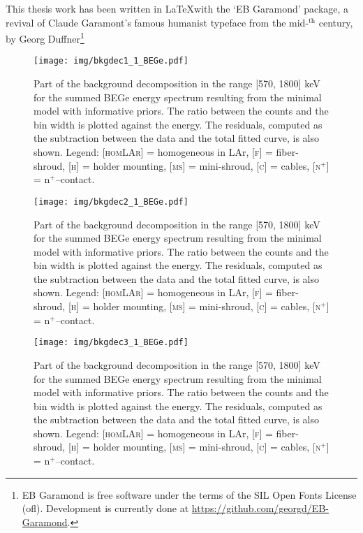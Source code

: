 This thesis work has been written in \LaTeX with the `EB Garamond' package, a revival of Claude Garamont's famous humanist typeface from the mid-$^\text{th}$ century, by Georg Duffner\footnote{EB Garamond is free software under the terms of the SIL Open Fonts License (ofl). Development is currently done at \url{https://github.com/georgd/EB-Garamond}.}
\begin{landscape}
	\begin{figure}
		\centering
		\texttt{[image: img/bkgdec1\_1\_BEGe.pdf]}
		\caption{Part of the background decomposition in the range [570, 1800] keV for the summed BEGe energy spectrum resulting from the minimal model with informative priors. The ratio between the counts and the bin width is plotted against the energy. The residuals, computed as the subtraction between the data and the total fitted curve, is also shown. Legend: \textsc{[homLAr]} = homogeneous in LAr, \textsc{[f]} = fiber-shroud, \textsc{[h]} = holder mounting, \textsc{[ms]} = mini-shroud, \textsc{[c]} = cables, \textsc{[n$^+$]} = n$^+$--contact.}\label{fig:bkgdec1}
	\end{figure}
	\begin{figure}
		\centering
		\texttt{[image: img/bkgdec2\_1\_BEGe.pdf]}
		\caption{Part of the background decomposition in the range [570, 1800] keV for the summed BEGe energy spectrum resulting from the minimal model with informative priors. The ratio between the counts and the bin width is plotted against the energy. The residuals, computed as the subtraction between the data and the total fitted curve, is also shown. Legend: \textsc{[homLAr]} = homogeneous in LAr, \textsc{[f]} = fiber-shroud, \textsc{[h]} = holder mounting, \textsc{[ms]} = mini-shroud, \textsc{[c]} = cables, \textsc{[n$^+$]} = n$^+$--contact.}
	\end{figure}
	\begin{figure}
		\centering
		\texttt{[image: img/bkgdec3\_1\_BEGe.pdf]}
		\caption{Part of the background decomposition in the range [570, 1800] keV for the summed BEGe energy spectrum resulting from the minimal model with informative priors. The ratio between the counts and the bin width is plotted against the energy. The residuals, computed as the subtraction between the data and the total fitted curve, is also shown. Legend: \textsc{[homLAr]} = homogeneous in LAr, \textsc{[f]} = fiber-shroud, \textsc{[h]} = holder mounting, \textsc{[ms]} = mini-shroud, \textsc{[c]} = cables, \textsc{[n$^+$]} = n$^+$--contact.}
	\end{figure}

\end{landscape}
